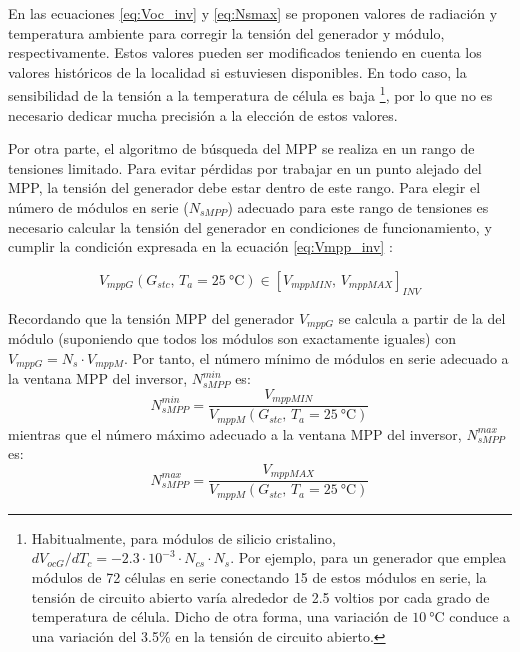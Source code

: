 En las ecuaciones \ref{eq:Voc_inv} y \ref{eq:Nsmax} se proponen
valores de radiación y temperatura ambiente para corregir la tensión
del generador y módulo, respectivamente.  Estos valores pueden ser
modificados teniendo en cuenta los valores históricos de la localidad
si estuviesen disponibles. En todo caso, la sensibilidad de la tensión
a la temperatura de célula es baja%
\footnote{Habitualmente, para módulos de silicio cristalino,
  $dV_{ocG}/dT_{c}=-2.3\cdot10^{-3}\cdot N_{cs}\cdot
  N_{s}$.  Por ejemplo, para un generador que emplea módulos
  de 72 células en serie conectando 15 de estos módulos en serie, la
  tensión de circuito abierto varía alrededor de 2.5 voltios por cada
  grado de temperatura de célula. Dicho de otra forma, una variación
  de $\SI{10}{\celsius}$ conduce a una variación del 3.5\% en la
  tensión de circuito abierto.%
}, por lo que no es necesario dedicar mucha precisión a la elección de
estos valores.

Por otra parte, el algoritmo de búsqueda del MPP se realiza en un
rango de tensiones limitado. Para evitar pérdidas por trabajar en
un punto alejado del MPP, la tensión del generador debe estar dentro
de este rango. Para elegir el número de módulos en serie ($N_{sMPP}$)
adecuado para este rango de tensiones es necesario calcular la tensión
del generador en condiciones de funcionamiento, y cumplir la condición
expresada en la ecuación
\ref{eq:Vmpp_inv}
: 

\begin{equation}
V_{mppG}(G_{stc},\, T_{a}=\SI{25}{\celsius})\in\left[V_{mppMIN},\,
  V_{mppMAX}\right]_{INV}\label{eq:Vmpp_inv}
\end{equation}

Recordando que la tensión MPP del generador $V_{mppG}$ se calcula a partir de la del módulo 
(suponiendo que todos los módulos son exactamente iguales) con
$V_{mppG}=N_{s}\cdot V_{mppM}$. Por tanto, el número mínimo de módulos en serie adecuado a la ventana
MPP del inversor, $N_{sMPP}^{min}$ es:
\begin{equation}
  \label{eq:Ns_mpp_min}
  N_{sMPP}^{min}=\frac{V_{mppMIN}}{V_{mppM}(G_{stc},\, T_{a}=\SI{25}{\celsius})}
\end{equation}
mientras que el número máximo adecuado a la ventana MPP del inversor, $N_{sMPP}^{max}$ es:
\begin{equation}
  \label{eq:Ns_mpp_max}
  N_{sMPP}^{max}=\frac{V_{mppMAX}}{V_{mppM}(G_{stc},\, T_{a}=\SI{25}{\celsius})}
\end{equation}


